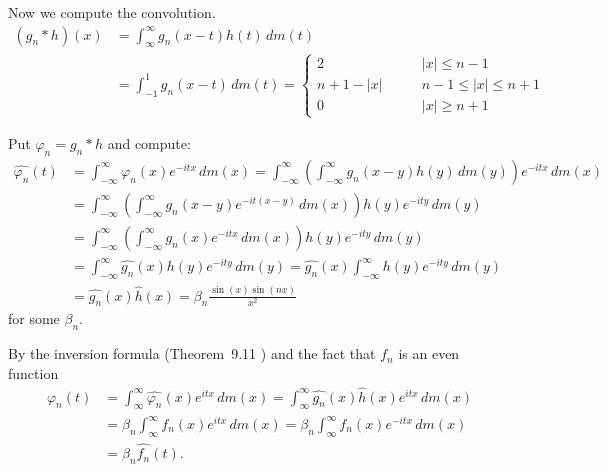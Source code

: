 \begin{enumerate}
Now we compute the convolution.
\begin{align*}
(g_n \ast h)(x)
 &= \int_{\infty}^\infty g_n(x-t)h(t)\,dm(t) \\
 &= \int_{-1}^1 g_n(x-t)\,dm(t)
  = \left\{
    \begin{array}{ll}
    2              & |x| \leq n - 1 \\
    n+1-|x| \qquad & n-1 \leq |x| \leq n+1 \\
    0 \qquad       & |x| \geq n + 1
    \end{array}\right.
\end{align*}

Put \(\varphi_n = g_n \ast h\) and compute:
\begin{align*}
\hat{\varphi_n}(t) 
 &= \int_{-\infty}^\infty \varphi_n(x)e^{-itx}\,dm(x)
 =  \int_{-\infty}^\infty 
         \left(\int_{-\infty}^\infty g_n(x-y)h(y)\,dm(y)\right)
         e^{-itx}\,dm(x) \\
 &= \int_{-\infty}^\infty 
          \left(\int_{-\infty}^\infty g_n(x-y)e^{-it(x-y)}\,dm(x)\right)
         h(y)e^{-ity}\,dm(y) \\
 &= \int_{-\infty}^\infty 
          \left(\int_{-\infty}^\infty g_n(x)e^{-itx}\,dm(x)\right)
         h(y)e^{-ity}\,dm(y) \\
 &= \int_{-\infty}^\infty \hat{g_n}(x) h(y)e^{-ity}\,dm(y) 
  = \hat{g_n}(x)  \int_{-\infty}^\infty h(y)e^{-ity}\,dm(y) \\
 &= \hat{g_n}(x) \hat{h}(x) = \beta_n \frac{\sin(x)\sin(nx)}{x^2}
\end{align*}
for some \(\beta_n\).

By the inversion formula (Theorem~9.11 \cite{RudinRCA87})
and the fact that \(f_n\) is an even function
\begin{align*}
\varphi_n(t) 
&= \int_{\infty}^\infty \hat{\varphi_n}(x) e^{itx}\,dm(x)
 = \int_{\infty}^\infty \hat{g_n}(x)\hat{h}(x) e^{itx}\,dm(x) \\
&= \beta_n \int_{\infty}^\infty f_n(x) e^{itx}\,dm(x) 
 = \beta_n \int_{\infty}^\infty f_n(x) e^{-itx}\,dm(x) \\
&= \beta_n \hat{f_n}(t).
\end{align*}



\end{enumerate}
